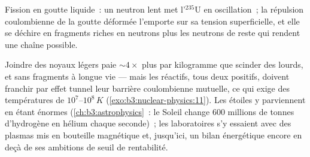 \begin{omfigure}

{\small Fission en goutte liquide~: un neutron lent met l'$^{235}$U
en oscillation~; la répulsion coulombienne de la goutte déformée
l'emporte sur sa tension superficielle, et elle se déchire en
fragments riches en neutrons plus les neutrons de reste qui rendent
une chaîne possible.}
\end{omfigure}

\begin{remark}\label{rem:b3:nuclear-physics:fusion}
Joindre des noyaux légers paie $\sim4\times$ plus par kilogramme que
scinder des lourds, et sans fragments à longue vie --- mais les
réactifs, tous deux positifs, doivent franchir par effet tunnel leur
barrière coulombienne mutuelle, ce qui exige des températures de
$10^7$--$10^8\,\unit{K}$ (\cref{exo:b3:nuclear-physics:11}). Les
étoiles y parviennent en étant énormes (\cref{ch:b3:astrophysics}~:
le Soleil change \qty{600}{} millions de tonnes d'hydrogène en hélium
chaque seconde)~; les laboratoires s'y essaient avec des plasmas mis
en bouteille magnétique et, jusqu'ici, un bilan énergétique encore en
deçà de ses ambitions de seuil de rentabilité.
\end{remark}

